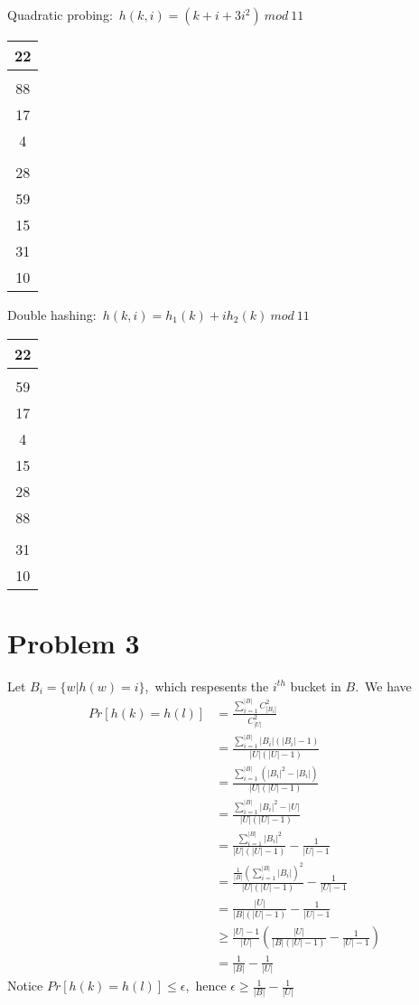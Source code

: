 \documentclass[]{article}
\begin{document}
	Quadratic probing:\ $h(k,i) = (k + i + 3i^2)\ mod\ 11$
	
	\begin{tabular}{|c|}
		\hline
		22\\
		\hline
		\\
		\hline
		88\\
		\hline
		17\\
		\hline
		4\\
		\hline
		\\
		\hline
		28\\
		\hline
		59\\
		\hline
		15\\
		\hline
		31\\
		\hline
		10\\
		\hline
	\end{tabular}

	Double hashing:\ $h(k,i) = h_1(k) + ih_2(k)\ mod\ 11$
	
	\begin{tabular}{|c|}
		\hline
		22\\
		\hline
		\\
		\hline
		59\\
		\hline
		17\\
		\hline
		4\\
		\hline
		15\\
		\hline
		28\\
		\hline
		88\\
		\hline
		\\
		\hline
		31\\
		\hline
		10\\
		\hline
	\end{tabular}

	\section{Problem 3}
	Let $B_i = \{w | h(w) = i\}$,\ which respesents the $i^{th}$ bucket in $B$.\ We have
	\begin{equation*}
		\begin{aligned}
		Pr[h(k) = h(l)] &= \frac{\sum_{i=1}^{|B|}C_{|B_i|}^2}{C_{|U|}^2}\\
		& = \frac{\sum_{i=1}^{|B|}|B_i|(|B_i| - 1)}{|U|(|U|-1)}\\
		& = \frac{\sum_{i=1}^{|B|}(|B_i|^2 - |B_i|)}{|U|(|U|-1)}\\
		& = \frac{\sum_{i=1}^{|B|}|B_i|^2 - |U|}{|U|(|U|-1)}\\
		& = \frac{\sum_{i=1}^{|B|}|B_i|^2}{|U|(|U|-1)} - \frac{1}{|U|-1}\\
		& = \frac{\frac{1}{|B|}(\sum_{i=1}^{|B|}|B_i|)^2}{|U|(|U|-1)} - \frac{1}{|U|-1}\\
		& = \frac{|U|}{|B|(|U|-1)} - \frac{1}{|U|-1}\\
		& \geq \frac{|U|-1}{|U|}(\frac{|U|}{|B|(|U|-1)} - \frac{1}{|U|-1})\\
		& = \frac{1}{|B|} - \frac{1}{|U|}
		\end{aligned}
	\end{equation*}
	Notice $Pr[h(k) = h(l)] \leq \epsilon$,\ hence $\epsilon \geq \frac{1}{|B|} - \frac{1}{|U|}$
	
\end{document}
